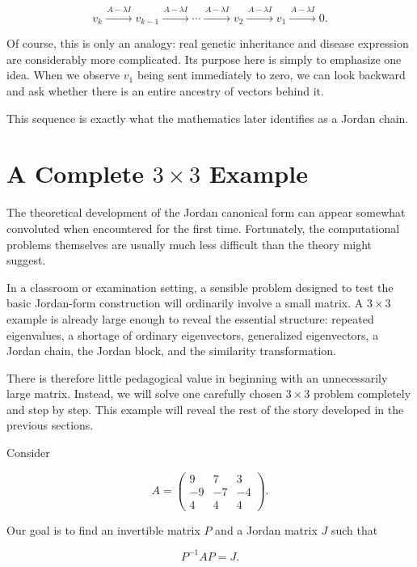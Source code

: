 \documentclass[11pt]{article}
\begin{document}
\[
\boxed{
v_k
\xrightarrow{\,A-\lambda I\,}
v_{k-1}
\xrightarrow{\,A-\lambda I\,}
\cdots
\xrightarrow{\,A-\lambda I\,}
v_2
\xrightarrow{\,A-\lambda I\,}
v_1
\xrightarrow{\,A-\lambda I\,}
0.
}
\]

Of course, this is only an analogy: real genetic inheritance and
disease expression are considerably more complicated.  Its purpose
here is simply to emphasize one idea.  When we observe \(v_1\) being
sent immediately to zero, we can look backward and ask whether there
is an entire ancestry of vectors behind it.

This sequence is exactly what the mathematics later identifies as a
Jordan chain.

\section{A Complete \(3\times3\) Example}

The theoretical development of the Jordan canonical form can appear
somewhat convoluted when encountered for the first time.  Fortunately,
the computational problems themselves are usually much less difficult
than the theory might suggest.

In a classroom or examination setting, a sensible problem designed to
test the basic Jordan-form construction will ordinarily involve a small
matrix.  A \(3\times3\) example is already large enough to reveal the
essential structure: repeated eigenvalues, a shortage of ordinary
eigenvectors, generalized eigenvectors, a Jordan chain, the Jordan
block, and the similarity transformation.

There is therefore little pedagogical value in beginning with an
unnecessarily large matrix.  Instead, we will solve one carefully
chosen \(3\times3\) problem completely and step by step.  This example
will reveal the rest of the story developed in the previous sections.

Consider

\[
\boxed{
A=
\begin{pmatrix}
9&7&3\\
-9&-7&-4\\
4&4&4
\end{pmatrix}.
}
\]

Our goal is to find an invertible matrix \(P\) and a Jordan matrix
\(J\) such that

\[
\boxed{
P^{-1}AP=J.
}
\]
\end{document}
